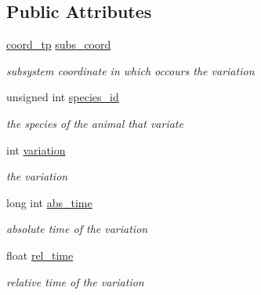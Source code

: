 \subsection*{Public Attributes}
\begin{DoxyCompactItemize}
\item 
\hypertarget{structPopulationVariation_a287eca2a34e5c68d3066456396408e03}{
\hyperlink{structPopulationVariation_aae36f241d7c3048d87f581bce205fcd1}{coord\_\-tp} \hyperlink{structPopulationVariation_a287eca2a34e5c68d3066456396408e03}{subs\_\-coord}}
\label{structPopulationVariation_a287eca2a34e5c68d3066456396408e03}

\begin{DoxyCompactList}\small\item\em subsystem coordinate in which occours the variation \end{DoxyCompactList}\item 
\hypertarget{structPopulationVariation_ad2f5ef6c52e0f3db00c5b5b66d7039e9}{
unsigned int \hyperlink{structPopulationVariation_ad2f5ef6c52e0f3db00c5b5b66d7039e9}{species\_\-id}}
\label{structPopulationVariation_ad2f5ef6c52e0f3db00c5b5b66d7039e9}

\begin{DoxyCompactList}\small\item\em the species of the animal that variate \end{DoxyCompactList}\item 
int \hyperlink{structPopulationVariation_a1dc7b506e2e3d3a0ba8ce0390a9d2c7d}{variation}
\begin{DoxyCompactList}\small\item\em the variation \end{DoxyCompactList}\item 
\hypertarget{structPopulationVariation_a49b63a98bc5c0d21ad541454afd9f39a}{
long int \hyperlink{structPopulationVariation_a49b63a98bc5c0d21ad541454afd9f39a}{abs\_\-time}}
\label{structPopulationVariation_a49b63a98bc5c0d21ad541454afd9f39a}

\begin{DoxyCompactList}\small\item\em absolute time of the variation \end{DoxyCompactList}\item 
\hypertarget{structPopulationVariation_a50a11ac13f338efd289b14b79ea87a02}{
float \hyperlink{structPopulationVariation_a50a11ac13f338efd289b14b79ea87a02}{rel\_\-time}}
\label{structPopulationVariation_a50a11ac13f338efd289b14b79ea87a02}

\begin{DoxyCompactList}\small\item\em relative time of the variation \end{DoxyCompactList}\end{DoxyCompactItemize}


